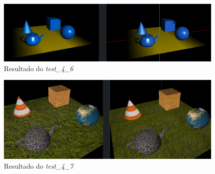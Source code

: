 \documentclass[runningheads]{llncs}
\begin{document}
    \begin{landscape}
        \begin{figure}
            \centering
            \includegraphics[width=\linewidth]{assets/testes/teste_4_6.png}
            \caption{Resultado do \textit{test_4_6}} \label{fig:teste_4_6}
        \end{figure}
    \end{landscape}

    \begin{landscape}
        \begin{figure}
            \centering
            \includegraphics[width=\linewidth]{assets/testes/teste_4_7.png}
            \caption{Resultado do \textit{test_4_7}} \label{fig:teste_4_7}
        \end{figure}
    \end{landscape}

    

    
\end{document}
